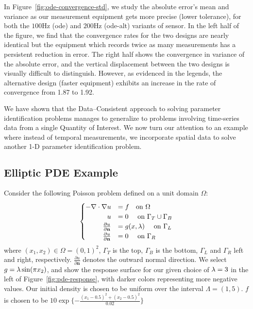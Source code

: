 In Figure~\ref{fig:ode-convergence-std}, we study the absolute error's mean and variance as our measurement equipment gets more precise (lower tolerance), for both the $100$Hz (ode) and $200$Hz (ode-alt) variants of sensor.
In the left half of the figure, we find that the convergence rates for the two designs are nearly identical but the equipment which records twice as many measurements has a persistent reduction in error.
The right half shows the convergence in variance of the absolute error, and the vertical displacement between the two designs is visually difficult to distinguish.
However, as evidenced in the legends, the alternative design (faster equipment) exhibits an increase in the rate of convergence from 1.87 to 1.92.

We have shown that the Data--Consistent approach to solving parameter identification problems manages to generalize to problems involving time-series data from a single Quantity of Interest.
We now turn our attention to an example where instead of temporal measurements, we incorporate spatial data to solve another 1-D parameter identification problem.

\FloatBarrier
\subsection{Elliptic PDE Example}\label{sec:pde-example}

Consider the following Poisson problem defined on a unit domain $\Omega$:
\begin{equation}\label{eq:pde-equation}
\begin{cases}
\hfill -\nabla \cdot \nabla u &= f \quad\text{on } \Omega \\
\hfill u &= 0 \quad\text{ on } \Gamma_T \cup \Gamma_B \\
\hfill \frac{\partial u}{\partial \mathbf{n}} &= g(x,\param) \quad\text{ on } \Gamma_L \\
\hfill \frac{\partial u}{\partial \mathbf{n}} &= 0 \quad\text{ on } \Gamma_R
\end{cases}
\end{equation}
where $(x_1, x_2) \in \Omega = (0,1)^2$, $\Gamma_T$ is the top, $\Gamma_B$ is the bottom, $\Gamma_L$ and $\Gamma_R$ left and right, respectively.
$\frac{\partial u}{\partial \mathbf{n}}$ denotes the outward normal direction.
We select $g=\lambda \sin(\pi x_2)$, and show the response surface for our given choice of $\lambda = 3$ in the left of Figure~\ref{fig:pde-response}, with darker colors representing more negative values.
Our initial density is chosen to be uniform over the interval $\Lambda = (1,5)$.
$f$ is chosen to be $10\exp\{-\frac{(x_1-0.5)^2 + (x_2 - 0.5)^2}{0.02}\}$


